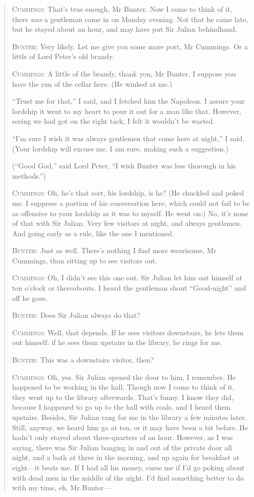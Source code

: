 \begin{quotation}
\textsc{Cummings}: That’s true enough, Mr Bunter. Now I come to think of it, there \textit{was} a gentleman come in on Monday evening. Not that he came late, but he stayed about an hour, and may have put Sir Julian behindhand.

\textsc{Bunter}: Very likely. Let me give you some more port, Mr Cummings. Or a little of Lord Peter’s old brandy.

\textsc{Cummings}: A little of the brandy, thank you, Mr Bunter. I suppose you have the run of the cellar here. (He winked at me.)

\enquote{Trust me for that,} I said, and I fetched him the Napoleon. I assure your lordship it went to my heart to pour it out for a man like that. However, seeing we had got on the right tack, I felt it wouldn’t be wasted.

\enquote{I’m sure I wish it was always gentlemen that come here at night,} I said. (Your lordship will excuse me, I am sure, making such a suggestion.)

(\enquote{Good God,} said Lord Peter, \enquote{I wish Bunter was less thorough in his methods.})

\textsc{Cummings}: Oh, he’s that sort, his lordship, is he? (He chuckled and poked me. I suppress a portion of his conversation here, which could not fail to be as offensive to your lordship as it was to myself. He went on:) No, it’s none of that with Sir Julian. Very few visitors at night, and always gentlemen. And going early as a rule, like the one I mentioned.

\textsc{Bunter}: Just as well. There’s nothing I find more wearisome, Mr Cummings, than sitting up to see visitors out.

\textsc{Cummings}: Oh, I didn’t see this one out. Sir Julian let him out himself at ten o’clock or thereabouts. I heard the gentleman shout \enquote{Good-night} and off he goes.

\textsc{Bunter}: Does Sir Julian always do that?

\textsc{Cummings}: Well, that depends. If he sees visitors downstairs, he lets them out himself: if he sees them upstairs in the library, he rings for me.

\textsc{Bunter}: This was a downstairs visitor, then?

\textsc{Cummings}: Oh, yes. Sir Julian opened the door to him, I remember. He happened to be working in the hall. Though now I come to think of it, they went up to the library afterwards. That’s funny. I know they did, because I happened to go up to the hall with coals, and I heard them upstairs. Besides, Sir Julian rang for me in the library a few minutes later. Still, anyway, we heard him go at ten, or it may have been a bit before. He hadn’t only stayed about three-quarters of an hour. However, as I was saying, there was Sir Julian banging in and out of the private door all night, and a bath at three in the morning, and up again for breakfast at eight\allowbreak---\allowbreak it beats me. If I had all his money, curse me if I’d go poking about with dead men in the middle of the night. I’d find something better to do with my time, eh, Mr Bunter---


\end{quotation}
